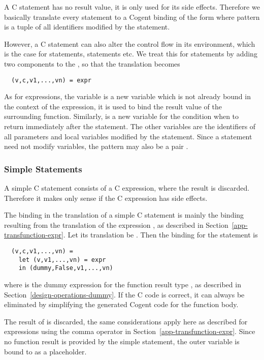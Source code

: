 A C statement has no result value, it is only used for its side effects. Therefore we basically translate every
statement to a Cogent binding of the form  where pattern is a tuple of all identifiers
modified by the statement.

However, a C statement can also alter the control flow in its environment, which is the case for 
 statements,  statements etc. We treat this for  statements by adding two 
components to the , so that the translation becomes
\begin{verbatim}
  (v,c,v1,...,vn) = expr
\end{verbatim}
As for expressions, the variable  is a
new variable which is not already bound in the context of the expression, it is used to bind the result value of the
surrounding function. Similarly,  is a new variable for the condition when to return immediately after the 
statement. The other variables are the identifiers of all parameters and local 
variables modified by the statement. Since a statement need not modify variables, the pattern may also be
a pair . 

\subsubsection{Simple Statements}

A simple C statement consists of a C expression, where the result is discarded. Therefore it makes only sense
if the C expression has side effects.

The binding in the translation of a simple C statement  is mainly the binding resulting from the translation 
of the expression , as described in Section~\ref{app-transfunction-expr}. Let its translation
be .
Then the binding for the statement  is
\begin{verbatim}
  (v,c,v1,...,vn) = 
    let (v,v1,...,vn) = expr
    in (dummy,False,v1,...,vn)
\end{verbatim}
where  is the dummy expression  for the function result type , as 
described in Section~\ref{design-operations-dummy}. If the C code is correct, it can always be eliminated by 
simplifying the generated Cogent code for the function body.

The result  of  is discarded, the same considerations apply here as described for expressions using
the comma operator in Section~\ref{app-transfunction-expr}. Since no function result is provided by the simple statement,
the outer variable  is bound to \code{()} as a placeholder.

